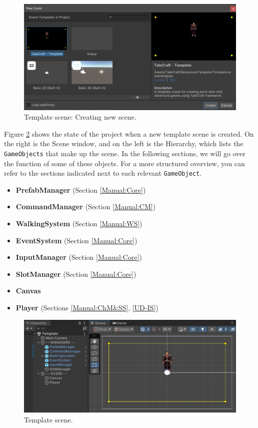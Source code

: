 \begin{figure}[H]
\centering
\includegraphics[width=.9\linewidth]{img/User doc/image_2025-07-09_161736255.png}
\caption{Template scene: Creating new scene.}
\label{fig:Tutorial-template:new}
\end{figure}

Figure \ref{fig:Tutorial-template} shows the state of the project when a new template scene is created. On the right is the Scene window, and on the left is the Hierarchy, which lists the \verb|GameObjects| that make up the scene. In the following sections, we will go over the function of some of these objects. For a more structured overview, you can refer to the sections indicated next to each relevant \texttt{GameObject}.

\begin{itemize}
    \item \textbf{PrefabManager} (Section \ref{Manual:Core})
    \item \textbf{CommandManager} (Section \ref{Manual:CM})
    \item \textbf{WalkingSystem} (Section \ref{Manual:WS})
    \item \textbf{EventSystem} (Section \ref{Manual:Core})
    \item \textbf{InputManager} (Section \ref{Manual:Core})
    \item \textbf{SlotManager} (Section \ref{Manual:Core})
    \item \textbf{Canvas}
    \item \textbf{Player} (Sections \ref{Manual:ChM&SS}, \ref{UD-IS})
\end{itemize}

\begin{figure}[H]
\centering
\includegraphics[width=.9\linewidth]{img/User doc/image_2025-07-10_103352984.png}
\caption{Template scene.}
\label{fig:Tutorial-template}
\end{figure}


